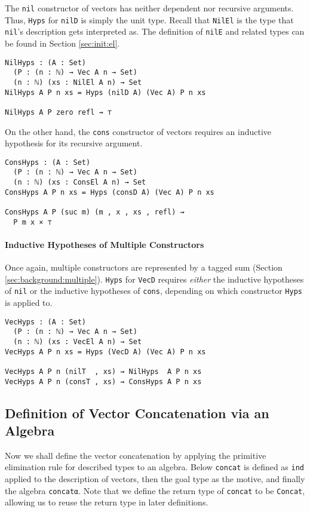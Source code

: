 \documentclass[preprint,nonatbib]{sigplanconf}
\newcommand{\refsec}[1]{Section \ref{sec:#1}}
\begin{document}
The {\tt nil} constructor of vectors has neither dependent nor
recursive arguments. Thus, {\tt Hyps} for {\tt nilD} is simply
the unit type. Recall that {\tt NilEl} is the type that
{\tt nil}'s description gets interpreted as. The definition of
{\tt nilE} and related types can be found in \refsec{init:el}.

\begin{verbatim}
NilHyps : (A : Set)
  (P : (n : ℕ) → Vec A n → Set)
  (n : ℕ) (xs : NilEl A n) → Set
NilHyps A P n xs = Hyps (nilD A) (Vec A) P n xs

NilHyps A P zero refl ⇝ ⊤
\end{verbatim}

On the other hand, the {\tt cons} constructor of vectors requires an
inductive hypothesis for its recursive argument.

\begin{verbatim}
ConsHyps : (A : Set)
  (P : (n : ℕ) → Vec A n → Set)
  (n : ℕ) (xs : ConsEl A n) → Set
ConsHyps A P n xs = Hyps (consD A) (Vec A) P n xs

ConsHyps A P (suc m) (m , x , xs , refl) ⇝
  P m x × ⊤
\end{verbatim}

\paragraph{Inductive Hypotheses of Multiple Constructors}

Once again, multiple constructors are represented by a tagged
sum (\refsec{background:multiple}). {\tt Hyps} for
{\tt VecD} requires {\it either} the inductive hypotheses of
{\tt nil} or the inductive hypotheses of {\tt cons}, depending on
which constructor {\tt Hyps} is applied to.

\begin{verbatim}
VecHyps : (A : Set)
  (P : (n : ℕ) → Vec A n → Set)
  (n : ℕ) (xs : VecEl A n) → Set
VecHyps A P n xs = Hyps (VecD A) (Vec A) P n xs

VecHyps A P n (nilT  , xs) ⇝ NilHyps  A P n xs 
VecHyps A P n (consT , xs) ⇝ ConsHyps A P n xs 
\end{verbatim}

\subsection{Definition of Vector Concatenation via an Algebra}

Now we shall define the vector concatenation by applying the primitive
elimination rule for described types to an algebra. Below
{\tt concat} is defined as {\tt ind} applied to the description of
vectors, then the goal type as the motive, and finally the algebra
{\tt concatα}.
Note that we define the return type of
{\tt concat} to be {\tt Concat}, allowing us to reuse the return type
in later definitions.
\end{document}
